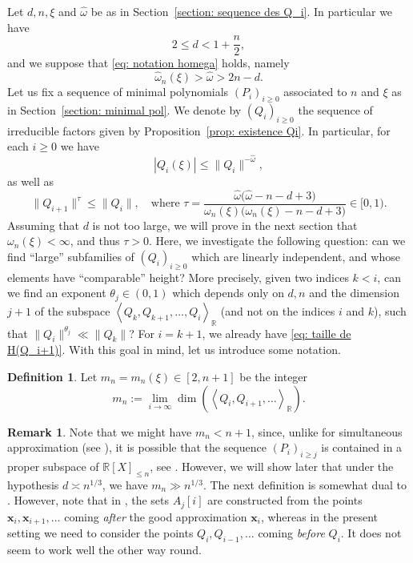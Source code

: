 \documentclass[JEP,XML,SOM,Unicode,NoFloatCountersInSection,published]{cedram}
\newcommand\bx{\boldsymbol{x}}
\newcommand\bR{\mathbb{R}}
\newcommand\homega{\widehat{\omega}}\newcommand\HH{\mathcal{H}}
\newcommand{\normH}[1]{\|#1\|}
\newcommand{\Vect}[2][]{\left\la #2\right\ra_{#1}}
\let\la\langle
\let\ra\rangle
\theoremstyle{definition}
\newtheorem{Def}{Definition}[section]
\newtheorem*{remark*}{Remark}
\theoremstyle{plain}
\begin{document}
Let $d,n,\xi$ and $\homega$ be as in Section~\ref{section: sequence des Q_i}. In particular we have
\[
2\leq d < 1+\frac{n}{2},
\]
and we suppose that \eqref{eq: notation homega} holds, namely
\[
\homega_n(\xi) > \homega > 2n -d.
\]
Let us fix a sequence of minimal polynomials $(P_i)_{i\geq 0}$ associated to $n$ and $\xi$ as in Section~\ref{section: minimal pol}. We denote by $(Q_i)_{i\geq 0}$ the sequence of irreducible factors given by Proposition~\ref{prop: existence Qi}. In particular, for each $i\geq 0$ we have
\begin{equation}
\label{eq: petitesse de Q_i(xi)}
|Q_i(\xi)| \leq \normH{Q_i}^{-\homega},
\end{equation}
as well as
\begin{equation}
\label{eq: taille de H(Q_i+1)}
\normH{Q_{i+1}}^\tau \leq \normH{Q_{i}}, \quad \textrm{where } \tau = \frac{\homega\big(\homega -n-d+3\big)}{\omega_n(\xi)\big(\omega_n(\xi)-n-d+3\big)} \in [0,1).
\end{equation}
Assuming that $d$ is not too large, we will prove in the next section that $\omega_n(\xi) < \infty$, and thus $\tau > 0$.
Here, we investigate the following question: can we find ``large'' subfamilies of $(Q_i)_{i\geq 0}$ which are linearly independent, and whose elements have ``comparable'' height? More precisely, given two indices $k< i$, can we find an exponent $\theta_j\in(0,1)$ which depends only on $d,n$ and the dimension $j+1$ of the subspace $\Vect[\bR]{Q_k,Q_{k+1},\dots,Q_i}$ (and not on the indices $i$ and $k$), such that $\normH{Q_i}^{\theta_j} \ll \normH{Q_k}$? For $i=k+1$, we already have \eqref{eq: taille de H(Q_i+1)}. With this goal in mind, let us introduce some notation.

\begin{Def}
\label{Def m_n}
Let $m_n = m_n(\xi) \in [2,n+1]$ be the integer
\[
m_n := \lim_{i\to\infty} \dim(\Vect[\bR]{Q_i,Q_{i+1},\dots}).
\]
\end{Def}

\begin{remark*}
Note that we might have $m_n < n+1$, since, unlike for simultaneous approximation (see \cite[Eq.\,(5.3)]{poels2022simultaneous}), it is possible that the sequence $(P_i)_{i\geq j}$ is contained in a proper subspace of $\bR[X]_{\leq n}$, see \eg \cite{moshchevitin2007best}. However, we will show later that under the hypothesis $d \asymp n^{1/3}$, we have $m_n\gg n^{1/3}$. The next definition is somewhat dual to \cite[Def.\,5.2]{poels2022simultaneous}. However, note that in \cite[Def.\,5.2]{poels2022simultaneous}, the sets $A_j[i]$ are constructed from the points $\bx_i,\bx_{i+1},\dots$ coming \emph{after} the good approximation $\bx_i$, whereas in the present setting we need to consider the points $Q_{i}, Q_{i-1},\dots$ coming \emph{before} $Q_i$. It does not seem to work well the other way round.
\end{remark*}
\end{document}
